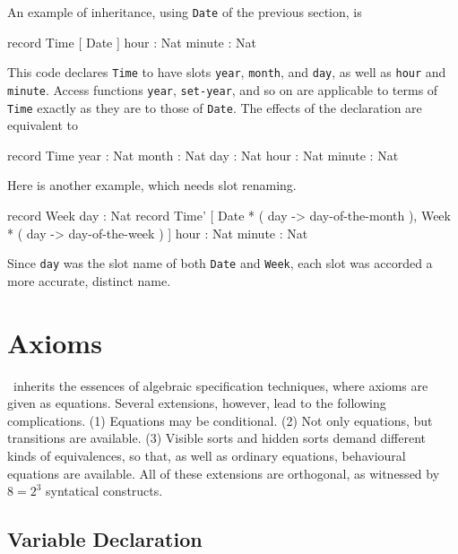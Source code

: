 \documentclass[a4paper]{memoir}
\begin{document}
An %
example of inheritance, using \verb|Date| of the previous
section, is
\begin{vvtm}
\begin{ccode}
   record Time [ Date ] {
     hour   : Nat
     minute : Nat
   }
\end{ccode}
\end{vvtm}
This code declares \verb|Time| to have slots \verb|year|, \verb|month|,
and \verb|day|, as well as \verb|hour| and \verb|minute|.
Access functions \verb|year|, \verb|set-year|, and so on are
applicable to terms of \verb|Time| exactly as they are
to those of \verb|Date|.
The effects of the declaration are equivalent to
\begin{vvtm}
\begin{ccode}
   record Time {
     year   : Nat
     month  : Nat
     day    : Nat
     hour   : Nat
     minute : Nat
   }
\end{ccode}
\end{vvtm}
Here is another example, which needs slot renaming.
\begin{vvtm}
\begin{ccode}
   record Week {
     day : Nat
   }
   record Time'
    [ Date * ( day -> day-of-the-month ), Week * ( day -> day-of-the-week ) ]
   {
      hour   : Nat
      minute : Nat
   }
\end{ccode}
\end{vvtm}
Since \verb|day| was the slot name of both \verb|Date| and \verb|Week|,
each slot was accorded a more accurate, distinct name.

\chapter{Axioms}\label{sec:p2-axioms}

\cafeobj~inherits the essences of algebraic specification techniques,
where axioms are given as equations. Several extensions, however,
lead to the following complications. (1) Equations may be conditional.
(2) Not only equations, but transitions are available.
(3) Visible sorts and hidden sorts demand different kinds of equivalences,
so that, as well as ordinary equations, behavioural equations are
available. All of these extensions are orthogonal, as witnessed by
$8 = 2^3$ syntatical constructs.

\section{Variable Declaration}\label{sec:p2-variable-decl}
\end{document}
